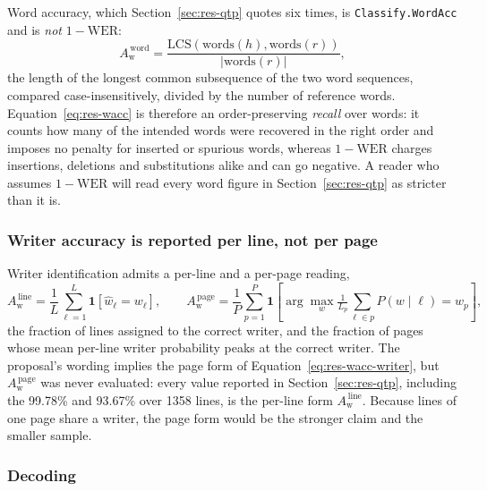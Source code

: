 Word accuracy, which Section~\ref{sec:res-qtp} quotes six times, is \texttt{Classify.WordAcc} and is \emph{not} $1-\mathrm{WER}$:
\begin{equation}
\label{eq:res-wacc}
A_{\mathrm{w}}^{\,\mathrm{word}}=\frac{\mathrm{LCS}(\mathrm{words}(h),\mathrm{words}(r))}{\lvert\mathrm{words}(r)\rvert},
\end{equation}
the length of the longest common subsequence of the two word sequences, compared case-insensitively, divided by the number of reference words.
Equation~\ref{eq:res-wacc} is therefore an order-preserving \emph{recall} over words: it counts how many of the intended words were recovered in the right order and imposes no penalty for inserted or spurious words, whereas $1-\mathrm{WER}$ charges insertions, deletions and substitutions alike and can go negative.
A reader who assumes $1-\mathrm{WER}$ will read every word figure in Section~\ref{sec:res-qtp} as stricter than it is.

\subsubsection{Writer accuracy is reported per line, not per page}

Writer identification admits a per-line and a per-page reading,
\begin{equation}
\label{eq:res-wacc-writer}
A_{\mathrm{w}}^{\,\mathrm{line}}=\frac{1}{L}\sum_{\ell=1}^{L}\mathbf{1}\!\left[\hat w_\ell=w_\ell\right],\qquad
A_{\mathrm{w}}^{\,\mathrm{page}}=\frac{1}{P}\sum_{p=1}^{P}\mathbf{1}\!\left[\arg\max_w \tfrac{1}{L_p}\textstyle\sum_{\ell\in p}P(w\mid\ell)=w_p\right],
\end{equation}
the fraction of lines assigned to the correct writer, and the fraction of pages whose mean per-line writer probability peaks at the correct writer.
The proposal's wording implies the page form of Equation~\ref{eq:res-wacc-writer}, but $A_{\mathrm{w}}^{\,\mathrm{page}}$ was never evaluated: every value reported in Section~\ref{sec:res-qtp}, including the 99.78\% and 93.67\% over 1358 lines, is the per-line form $A_{\mathrm{w}}^{\,\mathrm{line}}$.
Because lines of one page share a writer, the page form would be the stronger claim and the smaller sample.

\subsubsection{Decoding}

